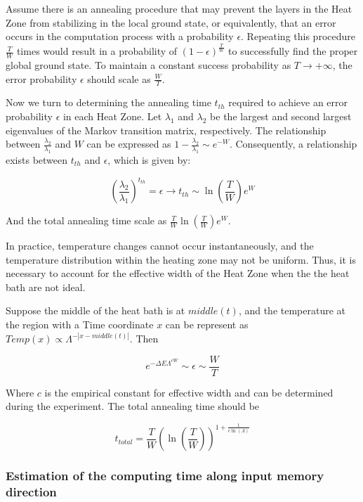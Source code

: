 \documentclass[twocolumn,superscriptaddress,english,showpacs,longbibliography]{revtex4-2}
\begin{document}
Assume there is an annealing procedure that may prevent the layers in the Heat Zone from stabilizing in the local ground state, or equivalently, that an error occurs in the computation process with a probability $\epsilon$. Repeating this procedure $\frac{T}{W}$ times would result in a probability of $(1-\epsilon)^{\frac{T}{W}}$ to successfully find the proper global ground state. To maintain a constant success probability as $T \rightarrow +\infty$, the error probability $\epsilon$ should scale as $\frac{W}{T}$.

Now we turn to determining the annealing time $t_{th}$ required to achieve an error probability $\epsilon$ in each Heat Zone. Let $\lambda_1$ and $\lambda_2$ be the largest and second largest eigenvalues of the Markov transition matrix, respectively. The relationship between $\frac{\lambda_2}{\lambda_1}$ and $W$ can be expressed as $1 - \frac{\lambda_2}{\lambda_1} \sim e^{-W}$. Consequently, a relationship exists between $t_{th}$ and $\epsilon$, which is given by:

\begin{equation}
    \left( \frac{\lambda_2}{\lambda_1} \right) ^ {t_{th}} = \epsilon \rightarrow t_{th} \sim \ln(\frac{T}{W})e^{W}
\end{equation}

And the total annealing time scale as $\frac{T}{W}\ln(\frac{T}{W})e^W$.

In practice, temperature changes cannot occur instantaneously, and the temperature distribution within the heating zone may not be uniform. Thus, it is necessary to account for the effective width of the Heat Zone when the the heat bath are not ideal.

Suppose the middle of the heat bath is at $middle(t)$, and the temperature at the region with a Time coordinate $x$ can be represent as $Temp(x) \propto \Lambda^{-|x - middle(t)|}$. Then

\begin{equation}
    e^{-\Delta E \Lambda^{cW}} \sim \epsilon \sim \frac{W}{T}
\end{equation}

Where $c$ is the empirical constant for effective width and can be determined during the experiment. The total annealing time should be

\begin{equation}
    t_{total} = \frac{T}{W}(\ln(\frac{T}{W}))^{1+ \frac{1}{c\ln(\Lambda)}}
\end{equation}

\subsubsection{Estimation of the computing time along input memory direction}\label{Estimation-of-the-computing-time-along-input-memory-direction}
\end{document}
